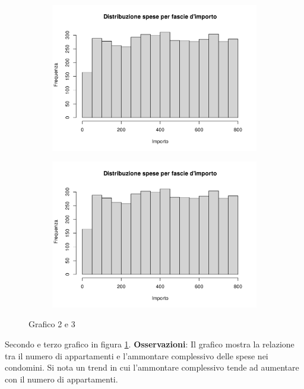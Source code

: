 \clearpage

\begin{figure}[h]
    \centering
    \begin{subfigure}[b]{0.5\textwidth}
        \centering
        \includegraphics[page=2,width=\textwidth]{../R/grafici.pdf}
    \end{subfigure}
    \hfill
    \begin{subfigure}[b]{0.5\textwidth}
        \centering
        \includegraphics[page=3,width=\textwidth]{../R/grafici.pdf}
    \end{subfigure}
    \caption{Grafico 2 e 3}
    \label{fig2}
\end{figure}

Secondo e terzo grafico in figura \ref{fig2}. \textbf{Osservazioni}: Il grafico mostra la relazione tra il numero di appartamenti e l'ammontare complessivo delle spese nei condomini. Si nota un trend in cui l'ammontare complessivo tende ad aumentare con il numero di appartamenti.

